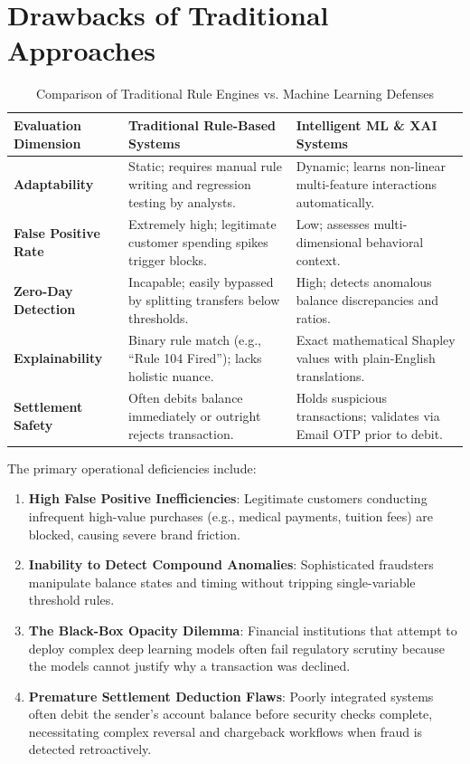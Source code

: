 \section{Drawbacks of Traditional Approaches}
\begin{table}[h]
\centering
\caption{Comparison of Traditional Rule Engines vs. Machine Learning Defenses}
\label{tab:rule_vs_ml}
\begin{tabularx}{\textwidth}{lXX}
\toprule
\textbf{Evaluation Dimension} & \textbf{Traditional Rule-Based Systems} & \textbf{Intelligent ML \& XAI Systems} \\
\midrule
\textbf{Adaptability} & Static; requires manual rule writing and regression testing by analysts. & Dynamic; learns non-linear multi-feature interactions automatically. \\
\addlinespace
\textbf{False Positive Rate} & Extremely high; legitimate customer spending spikes trigger blocks. & Low; assesses multi-dimensional behavioral context. \\
\addlinespace
\textbf{Zero-Day Detection} & Incapable; easily bypassed by splitting transfers below thresholds. & High; detects anomalous balance discrepancies and ratios. \\
\addlinespace
\textbf{Explainability} & Binary rule match (e.g., ``Rule 104 Fired''); lacks holistic nuance. & Exact mathematical Shapley values with plain-English translations. \\
\addlinespace
\textbf{Settlement Safety} & Often debits balance immediately or outright rejects transaction. & Holds suspicious transactions; validates via Email OTP prior to debit. \\
\bottomrule
\end{tabularx}
\end{table}

The primary operational deficiencies include:
\begin{enumerate}[label=\arabic*.]
    \item \textbf{High False Positive Inefficiencies}: Legitimate customers conducting infrequent high-value purchases (e.g., medical payments, tuition fees) are blocked, causing severe brand friction.
    \item \textbf{Inability to Detect Compound Anomalies}: Sophisticated fraudsters manipulate balance states and timing without tripping single-variable threshold rules.
    \item \textbf{The Black-Box Opacity Dilemma}: Financial institutions that attempt to deploy complex deep learning models often fail regulatory scrutiny because the models cannot justify why a transaction was declined.
    \item \textbf{Premature Settlement Deduction Flaws}: Poorly integrated systems often debit the sender's account balance before security checks complete, necessitating complex reversal and chargeback workflows when fraud is detected retroactively.
\end{enumerate}


